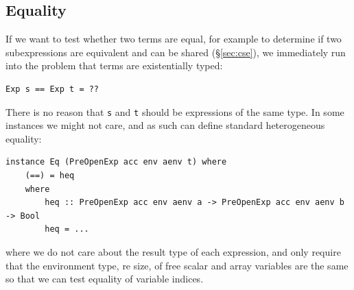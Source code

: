
\subsection{Equality}

If we want to test whether two terms are equal, for example to determine if two
subexpressions are equivalent and can be shared (\S\ref{sec:cse}), we
immediately run into the problem that terms are existentially typed:
%
\begin{lstlisting}[style=haskell]
Exp s == Exp t = ??
\end{lstlisting}
%
There is no reason that \texttt{s} and \texttt{t} should be expressions of the
same type. In some instances we might not care, and as such can define standard
heterogeneous equality:
%
\begin{lstlisting}[style=haskell]
instance Eq (PreOpenExp acc env aenv t) where
    (==) = heq
    where
        heq :: PreOpenExp acc env aenv a -> PreOpenExp acc env aenv b -> Bool
        heq = ...
\end{lstlisting}
%
where we do not care about the result type of each expression, and only require
that the environment type, re size, of free scalar and array variables are the
same so that we can test equality of variable indices.

